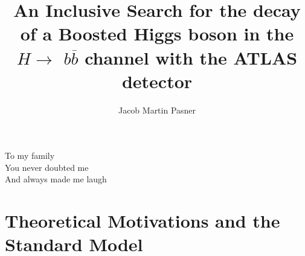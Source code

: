 \documentclass[11pt]{ucthesis}
\begin{document}

\title{An Inclusive Search for the decay of a Boosted Higgs boson in the $H
\rightarrow$ \MakeLowercase{$b\overline{b}$} channel with the ATLAS detector}
\author{Jacob Martin Pasner}
\deanlinethree{}

\begin{frontmatter}

\maketitle
\copyrightpage

\tableofcontents
\listoffigures
\listoftables

\begin{abstract}



\end{abstract}

\begin{dedication}
\null\vfil
{\large
\begin{center}
To my family\\\vspace{12pt}
You never doubted me\\\vspace{12pt}
And always made me laugh
\end{center}}
\vfil\null
\end{dedication}


\begin{acknowledgements}



\end{acknowledgements}

\end{frontmatter}




\part{Theoretical Motivations and the Standard Model}
\end{document}
